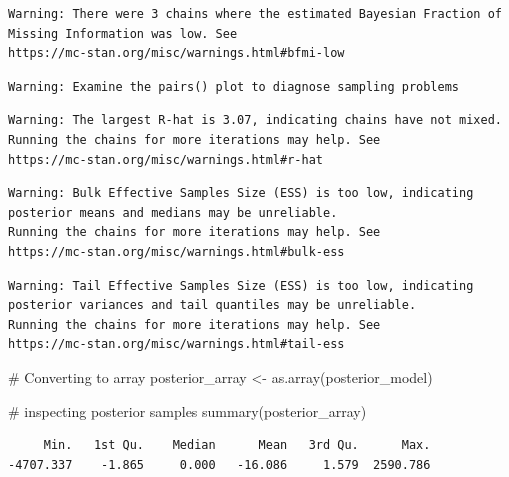 \documentclass[
  10pt,
]{article}
\newenvironment{Shaded}{\begin{snugshade}}{\end{snugshade}}
\newcommand{\AttributeTok}[1]{\textcolor[rgb]{0.40,0.45,0.13}{#1}}
\newcommand{\CommentTok}[1]{\textcolor[rgb]{0.37,0.37,0.37}{#1}}
\newcommand{\DecValTok}[1]{\textcolor[rgb]{0.68,0.00,0.00}{#1}}
\newcommand{\FunctionTok}[1]{\textcolor[rgb]{0.28,0.35,0.67}{#1}}
\newcommand{\NormalTok}[1]{\textcolor[rgb]{0.00,0.23,0.31}{#1}}
\newcommand{\OtherTok}[1]{\textcolor[rgb]{0.00,0.23,0.31}{#1}}
\newcommand{\SpecialCharTok}[1]{\textcolor[rgb]{0.37,0.37,0.37}{#1}}
\begin{document}
\begin{verbatim}
Warning: There were 3 chains where the estimated Bayesian Fraction of Missing Information was low. See
https://mc-stan.org/misc/warnings.html#bfmi-low
\end{verbatim}

\begin{verbatim}
Warning: Examine the pairs() plot to diagnose sampling problems
\end{verbatim}

\begin{verbatim}
Warning: The largest R-hat is 3.07, indicating chains have not mixed.
Running the chains for more iterations may help. See
https://mc-stan.org/misc/warnings.html#r-hat
\end{verbatim}

\begin{verbatim}
Warning: Bulk Effective Samples Size (ESS) is too low, indicating posterior means and medians may be unreliable.
Running the chains for more iterations may help. See
https://mc-stan.org/misc/warnings.html#bulk-ess
\end{verbatim}

\begin{verbatim}
Warning: Tail Effective Samples Size (ESS) is too low, indicating posterior variances and tail quantiles may be unreliable.
Running the chains for more iterations may help. See
https://mc-stan.org/misc/warnings.html#tail-ess
\end{verbatim}

\begin{Shaded}
\begin{Highlighting}[]
\CommentTok{\# Converting to array }
\NormalTok{posterior\_array }\OtherTok{\textless{}{-}} \FunctionTok{as.array}\NormalTok{(posterior\_model)}

\CommentTok{\# inspecting posterior samples}
\FunctionTok{summary}\NormalTok{(posterior\_array) }
\end{Highlighting}
\end{Shaded}

\begin{verbatim}
     Min.   1st Qu.    Median      Mean   3rd Qu.      Max. 
-4707.337    -1.865     0.000   -16.086     1.579  2590.786 
\end{verbatim}

\begin{Shaded}
\end{Shaded}
\end{document}
